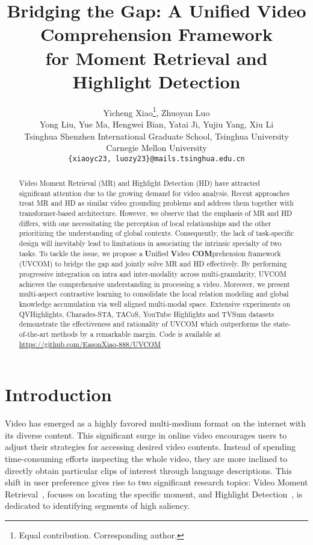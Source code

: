 \documentclass[10pt,twocolumn,letterpaper]{article}
\title{Bridging the Gap: A Unified Video Comprehension Framework \\for Moment Retrieval and Highlight Detection}
\author{Yicheng Xiao\thanks{Equal contribution.
   Corresponding author.}, \quad Zhuoyan Luo\\
  Yong Liu, Yue Ma, Hengwei Bian, Yatai Ji, Yujiu Yang, Xiu Li \\
  Tsinghua Shenzhen International Graduate School, Tsinghua University\\
  Carnegie Mellon University\\
{\tt\small \{xiaoyc23, luozy23\}@mails.tsinghua.edu.cn}
}
\begin{document}
\maketitle
\begin{abstract}
Video Moment Retrieval (MR) and Highlight Detection (HD) have attracted significant attention due to the growing demand for video analysis.
Recent approaches treat MR and HD as similar video grounding problems and address them together with transformer-based architecture.
However, we observe that the emphasis of MR and HD differs, with one necessitating the perception of local relationships and the other prioritizing the understanding of global contexts.
Consequently, the lack of task-specific design will inevitably lead to limitations in associating the intrinsic specialty of two tasks.
To tackle the issue, we propose a \textbf{U}nified \textbf{V}ideo \textbf{COM}prehension framework (UVCOM) to bridge the gap and jointly solve MR and HD effectively.
By performing progressive integration on intra and inter-modality across multi-granularity, UVCOM achieves the comprehensive understanding in processing a video.
Moreover, we present multi-aspect contrastive learning to consolidate the local relation modeling and global knowledge accumulation via well aligned multi-modal space.
Extensive experiments on QVHighlights, Charades-STA, TACoS, YouTube Highlights and TVSum datasets demonstrate the effectiveness and rationality of UVCOM which outperforms the state-of-the-art methods by a remarkable margin.
Code is available at \href{https://github.com/EasonXiao-888/UVCOM}{https://github.com/EasonXiao-888/UVCOM}



\end{abstract} \section{Introduction}
\label{sec:intro}
Video has emerged as a highly favored multi-medium format on the internet with its diverse content.
This significant surge in online video encourages users to adjust their strategies for accessing desired video contents.
Instead of spending time-consuming efforts inspecting the whole video, they are more inclined to directly obtain particular clips of interest through language descriptions.
This shift in user preference gives rise to two significant research topics: Video Moment Retrieval~\cite{ctrl,early_mr_1,man,recent_mr_1,recent_mr_2}, focuses on locating the specific moment, and Highlight Detection~\cite{video2gif,Yao_2016,cvs,LIM-s,joint_va}, is dedicated to identifying segments of high saliency.
\end{document}
